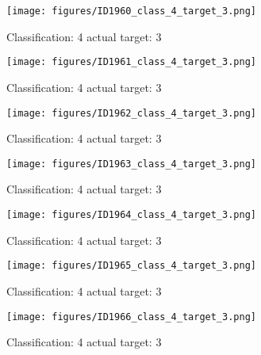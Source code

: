 \begin{figure}[h!]
\begin{center}
\texttt{[image: figures/ID1960\_class\_4\_target\_3.png]}
\end{center}
\caption{ Classification: 4 actual target: 3}
\label{fig:ID1960_class_4_target_3}
\end{figure}
\begin{figure}[h!]
\begin{center}
\texttt{[image: figures/ID1961\_class\_4\_target\_3.png]}
\end{center}
\caption{ Classification: 4 actual target: 3}
\label{fig:ID1961_class_4_target_3}
\end{figure}
\begin{figure}[h!]
\begin{center}
\texttt{[image: figures/ID1962\_class\_4\_target\_3.png]}
\end{center}
\caption{ Classification: 4 actual target: 3}
\label{fig:ID1962_class_4_target_3}
\end{figure}
\begin{figure}[h!]
\begin{center}
\texttt{[image: figures/ID1963\_class\_4\_target\_3.png]}
\end{center}
\caption{ Classification: 4 actual target: 3}
\label{fig:ID1963_class_4_target_3}
\end{figure}
\begin{figure}[h!]
\begin{center}
\texttt{[image: figures/ID1964\_class\_4\_target\_3.png]}
\end{center}
\caption{ Classification: 4 actual target: 3}
\label{fig:ID1964_class_4_target_3}
\end{figure}
\begin{figure}[h!]
\begin{center}
\texttt{[image: figures/ID1965\_class\_4\_target\_3.png]}
\end{center}
\caption{ Classification: 4 actual target: 3}
\label{fig:ID1965_class_4_target_3}
\end{figure}
\begin{figure}[h!]
\begin{center}
\texttt{[image: figures/ID1966\_class\_4\_target\_3.png]}
\end{center}
\caption{ Classification: 4 actual target: 3}
\label{fig:ID1966_class_4_target_3}
\end{figure}

